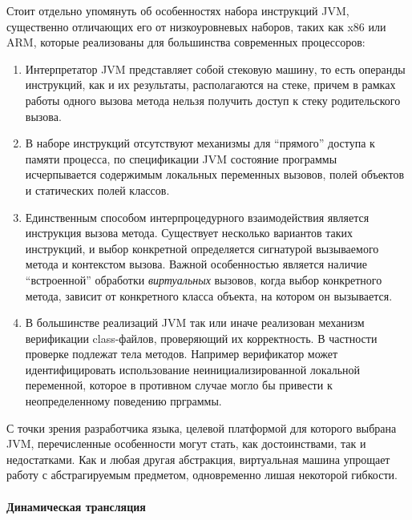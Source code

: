 Стоит отдельно упомянуть об особенностях набора инструкций JVM, существенно отличающих его
от низкоуровневых наборов, таких как x86 или ARM, которые реализованы для большинства современных
процессоров:
\begin{enumerate}
    \item Интерпретатор JVM представляет собой стековую машину, то есть операнды инструкций, как и
    их результаты, располагаются на стеке, причем в рамках работы одного вызова метода
    нельзя получить доступ к стеку родительского вызова.
    \item В наборе инструкций отсутствуют механизмы для ``прямого'' доступа к памяти процесса, по
    спецификации JVM состояние программы исчерпывается содержимым локальных переменных вызовов,
    полей объектов и статических полей классов.
    \item Единственным способом интерпроцедурного взаимодействия является инструкция вызова метода.
    Существует несколько вариантов таких инструкций, и выбор конкретной определяется сигнатурой
    вызываемого метода и контекстом вызова. Важной особенностью является наличие ``встроенной''
    обработки \textit{виртуальных} вызовов, %
    когда выбор конкретного метода, зависит от конкретного класса объекта, на котором он вызывается.
    \item В большинстве реализаций JVM так или иначе реализован механизм верификации class-файлов,
    проверяющий их корректность. В частности проверке подлежат тела методов. Например верификатор
    может идентифицировать использование неинициализированной локальной переменной,
    которое в противном случае могло бы привести к неопределенному поведению прграммы.
\end{enumerate}

С точки зрения разработчика языка, целевой платформой для которого выбрана JVM, перечисленные
особенности могут стать, как достоинствами, так и недостатками. Как и любая другая абстракция,
виртуальная машина упрощает работу с абстрагируемым предметом, одновременно лишая некоторой
гибкости.

\paragraph{Динамическая трансляция}


